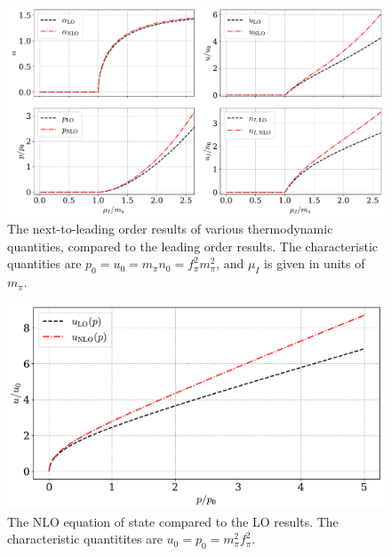 \clearpage

\begin{figure}[p]
    \centering
    \includegraphics[width=\textwidth]{../scripts/figurer/pion_nlo_945.pdf}
    \caption{The next-to-leading order results of various thermodynamic quantities, compared to the leading order results. The characteristic quantities are $p_0 = u_0 = m_\pi n_0 = f_\pi^2 m_\pi^2$, and $\mu_I$ is given in units of $m_\pi$.}
    \label{fig: nlo quantitites}
\end{figure}


\begin{figure}[p]
    \centering
    \includegraphics[width=.8\textwidth]{../scripts/figurer/pion_eos_nlo.pdf}
    \caption{The NLO equation of state compared to the LO results. The characteristic quantitites are $u_0 = p_0 = m_\pi^2 f_\pi^2$.}
    \label{fig: nlo eos}
\end{figure}

\clearpage

